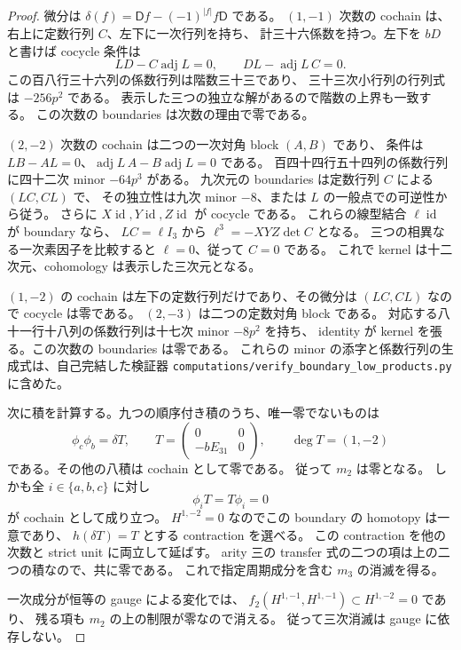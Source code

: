 \begin{proof}
微分は $\delta(f)=\mathsf Df-(-1)^{|f|}f\mathsf D$ である。
$(1,-1)$ 次数の cochain は、右上に定数行列 $C$、左下に一次行列を持ち、
計三十六係数を持つ。左下を $bD$ と書けば cocycle 条件は
\[
 LD-C\operatorname{adj}L=0,\qquad
 DL-\operatorname{adj}L\,C=0.
\]
この百八行三十六列の係数行列は階数三十三であり、
三十三次小行列の行列式は $-256p^2$ である。
表示した三つの独立な解があるので階数の上界も一致する。
この次数の boundaries は次数の理由で零である。

$(2,-2)$ 次数の cochain は二つの一次対角 block $(A,B)$ であり、
条件は $LB-AL=0$、$\operatorname{adj}L\,A-B\operatorname{adj}L=0$ である。
百四十四行五十四列の係数行列に四十二次 minor $-64p^3$ がある。
九次元の boundaries は定数行列 $C$ による $(LC,CL)$ で、
その独立性は九次 minor $-8$、または $L$ の一般点での可逆性から従う。
さらに $X\operatorname{id},Y\operatorname{id},Z\operatorname{id}$ が cocycle である。
これらの線型結合 $\ell\operatorname{id}$ が boundary なら、
$LC=\ell I_3$ から $\ell^3=-XYZ\det C$ となる。
三つの相異なる一次素因子を比較すると $\ell=0$、従って $C=0$ である。
これで kernel は十二次元、cohomology は表示した三次元となる。

$(1,-2)$ の cochain は左下の定数行列だけであり、その微分は $(LC,CL)$
なので cocycle は零である。
$(2,-3)$ は二つの定数対角 block である。
対応する八十一行十八列の係数行列は十七次 minor $-8p^2$ を持ち、
identity が kernel を張る。この次数の boundaries は零である。
これらの minor の添字と係数行列の生成式は、自己完結した検証器
\texttt{computations/verify\_boundary\_low\_products.py} に含めた。

次に積を計算する。九つの順序付き積のうち、唯一零でないものは
\[
 \phi_c\phi_b=\delta T,\qquad
 T=\begin{pmatrix}0&0\\-bE_{31}&0\end{pmatrix},
 \qquad \deg T=(1,-2)
\]
である。その他の八積は cochain として零である。
従って $m_2$ は零となる。
しかも全 $i\in\{a,b,c\}$ に対し
\[
 \phi_iT=T\phi_i=0
\]
が cochain として成り立つ。
$H^{1,-2}=0$ なのでこの boundary の homotopy は一意であり、
$h(\delta T)=T$ とする contraction を選べる。
この contraction を他の次数と strict unit に両立して延ばす。
arity 三の transfer 式の二つの項は上の二つの積なので、共に零である。
これで指定周期成分を含む $m_3$ の消滅を得る。

一次成分が恒等の gauge による変化では、
$f_2(H^{1,-1},H^{1,-1})\subset H^{1,-2}=0$ であり、
残る項も $m_2$ の上の制限が零なので消える。
従って三次消滅は gauge に依存しない。
\end{proof}

